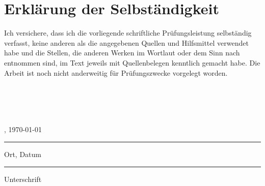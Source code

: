\chapter*{Erklärung der Selbständigkeit}
\markboth{}{}

Ich versichere, dass ich die vorliegende schriftliche Prüfungsleistung selbständig verfasst, keine anderen als die angegebenen Quellen und Hilfsmittel verwendet habe und die Stellen, die anderen Werken im Wortlaut oder dem Sinn nach entnommen sind, im Text jeweils mit Quellenbelegen kenntlich gemacht habe. Die Arbeit ist noch nicht anderweitig für Prüfungszwecke vorgelegt worden.
\\
\\
\\
\\
\\

\parbox{6cm}{\centering  \ortderarbeit, \today\hrule\strut\centering\footnotesize Ort, Datum}
\hfill
\vspace{-2cm}
\parbox{6cm}{ \hrule\strut \centering\footnotesize Unterschrift}



